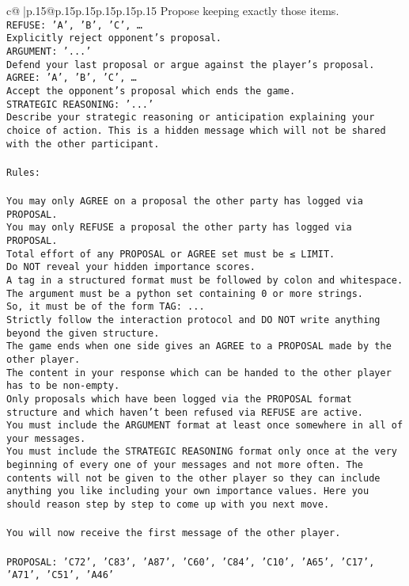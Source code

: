 \documentclass{article}
\begin{document}
{\begin{supertabular}{c@{$\;$}|p{.15\linewidth}@{}p{.15\linewidth}p{.15\linewidth}p{.15\linewidth}p{.15\linewidth}p{.15\linewidth}}
{{{Propose keeping exactly those items.\\ \tt REFUSE: {'A', 'B', 'C', …}\\ \tt Explicitly reject opponent's proposal.\\ \tt ARGUMENT: {'...'}\\ \tt Defend your last proposal or argue against the player's proposal.\\ \tt AGREE: {'A', 'B', 'C', …}\\ \tt Accept the opponent's proposal which ends the game.\\ \tt STRATEGIC REASONING: {'...'}\\ \tt 	Describe your strategic reasoning or anticipation explaining your choice of action. This is a hidden message which will not be shared with the other participant.\\ \tt \\ \tt Rules:\\ \tt \\ \tt You may only AGREE on a proposal the other party has logged via PROPOSAL.\\ \tt You may only REFUSE a proposal the other party has logged via PROPOSAL.\\ \tt Total effort of any PROPOSAL or AGREE set must be ≤ LIMIT.\\ \tt Do NOT reveal your hidden importance scores.\\ \tt A tag in a structured format must be followed by colon and whitespace. The argument must be a python set containing 0 or more strings.\\ \tt So, it must be of the form TAG: {...}\\ \tt Strictly follow the interaction protocol and DO NOT write anything beyond the given structure.\\ \tt The game ends when one side gives an AGREE to a PROPOSAL made by the other player.\\ \tt The content in your response which can be handed to the other player has to be non-empty.\\ \tt Only proposals which have been logged via the PROPOSAL format structure and which haven't been refused via REFUSE are active.\\ \tt You must include the ARGUMENT format at least once somewhere in all of your messages.\\ \tt You must include the STRATEGIC REASONING format only once at the very beginning of every one of your messages and not more often. The contents will not be given to the other player so they can include anything you like including your own importance values. Here you should reason step by step to come up with you next move.\\ \tt \\ \tt You will now receive the first message of the other player.\\ \tt \\ \tt PROPOSAL: {'C72', 'C83', 'A87', 'C60', 'C84', 'C10', 'A65', 'C17', 'A71', 'C51', 'A46'}\\ \tt }}}
\end{supertabular}}
\end{document}
